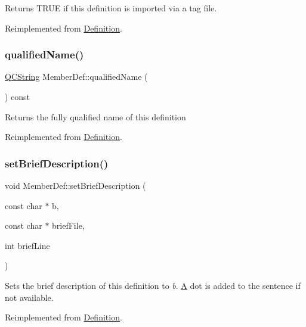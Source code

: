 Returns T\+R\+UE if this definition is imported via a tag file. 

Reimplemented from \mbox{\hyperlink{class_definition_a8405121cdc0253ec9633a87500ac47ba}{Definition}}.

\mbox{\label{class_member_def_a910beace3eb5065c82c9c9f452532dfc}} 
\subsubsection{\texorpdfstring{qualifiedName()}{qualifiedName()}}
{\footnotesize\ttfamily \mbox{\hyperlink{class_q_c_string}{Q\+C\+String}} Member\+Def\+::qualified\+Name (\begin{DoxyParamCaption}{ }\end{DoxyParamCaption}) const\hspace{0.3cm}{\ttfamily [virtual]}}

Returns the fully qualified name of this definition 

Reimplemented from \mbox{\hyperlink{class_definition_a60354ebca3cb065a4a6aa1944a9309d5}{Definition}}.

\mbox{\label{class_member_def_ac4a25886f70c3888e60c8e5d736720e5}} 
\subsubsection{\texorpdfstring{setBriefDescription()}{setBriefDescription()}}
{\footnotesize\ttfamily void Member\+Def\+::set\+Brief\+Description (\begin{DoxyParamCaption}\item[{const char $\ast$}]{b,  }\item[{const char $\ast$}]{brief\+File,  }\item[{int}]{brief\+Line }\end{DoxyParamCaption})\hspace{0.3cm}{\ttfamily [virtual]}}

Sets the brief description of this definition to {\itshape b}. \mbox{\hyperlink{class_a}{A}} dot is added to the sentence if not available. 

Reimplemented from \mbox{\hyperlink{class_definition_a5f6f7e25d740acb612b57365f9fccfc2}{Definition}}.

